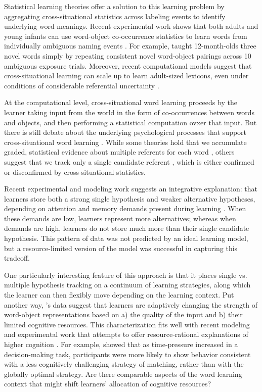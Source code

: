 \documentclass[10pt,letterpaper]{article}
\begin{document}
Statistical learning theories offer a solution to this learning problem by aggregating cross-situational statistics across labeling events to identify underlying word meanings. Recent experimental work shows that both adults and young infants can use word-object co-occurrence statistics to learn words from individually ambiguous naming events \cite{smith2008infants, vouloumanos2008fine}. For example,  taught 12-month-olds three novel words simply by repeating consistent novel word-object pairings across 10 ambiguous exposure trials. Moreover, recent computational models suggest that cross-situational learning can scale up to learn adult-sized lexicons, even under conditions of considerable referential uncertainty \cite{smith2011cross}.

At the computational level, cross-situational word learning proceeds by the learner taking input from the world in the form of co-occurrences between words and objects, and then performing a statistical computation ovxer that input. But there is still debate about the underlying psychological processes that support cross-situational word learning \cite{smith2014unrealized}. While some theories hold that we accumulate graded, statistical evidence about multiple referents for each word \cite{mcmurray2012word}, others suggest that we track only a single candidate referent \cite{trueswell2013propose}, which is either confirmed or disconfirmed by cross-situational statistics.  


Recent experimental and modeling work suggests an integrative explanation: that learners store both a strong single hypothesis and weaker alternative hypotheses, depending on attention and memory demands present during learning \cite{yurovsky2014algorithmic}. When these demands are low, learners represent more alternatives; whereas when demands are high, learners do not store much more than their single candidate hypothesis. This pattern of data was not predicted by an ideal learning model, but a resource-limited version of the model was successful in capturing this tradeoff.

One particularly interesting feature of this approach is that it places single vs. multiple hypothesis tracking on a continuum of learning strategies, along which the learner can then flexibly move depending on the learning context. Put another way, 's data suggest that learners are adaptively changing the strength of word-object representations based on a) the quality of the input and b) their limited cognitive resources. This characterization fits well with recent modeling and experimental work that attempts to offer resource-rational explanations of higher cognition \cite{griffiths2014rational}. For example,  showed that as time-pressure increased in a decision-making task, participants were more likely to show behavior consistent with a less cognitively challenging strategy of matching, rather than with the globally optimal strategy. Are there comparable aspects of the word learning context that might shift learners' allocation of cognitive resources?
\end{document}
